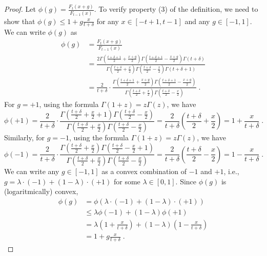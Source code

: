 \begin{proof}
Let $\phi(g) = \frac{F_t(x+g)}{F_{t-1}(x)}$. To verify property (3) of the definition,
we need to show that $\phi(g) \le 1 + g \frac{x}{t+\delta}$
for any $x \in [-t+1, t-1]$ and any $g \in [-1,1]$. We can write $\phi(g)$ as
\begin{align*}
\phi(g)
& = \frac{F_t(x+g)}{F_{t-1}(x)} \\
& = \frac{2 \Gamma(\frac{t+\delta+1}{2} + \frac{x+g}{2}) \Gamma(\frac{t+\delta+1}{2} - \frac{x+g}{2}) \Gamma(t + \delta)}{\Gamma(\frac{t+\delta}{2} + \frac{x}{2}) \Gamma(\frac{t+\delta}{2} - \frac{x}{2}) \Gamma(t+\delta+1)} \\
& = \frac{2}{t+\delta} \cdot \frac{\Gamma(\frac{t+\delta+1}{2} + \frac{x+g}{2}) \Gamma(\frac{t+\delta+1}{2} - \frac{x+g}{2})}{\Gamma(\frac{t+\delta}{2} + \frac{x}{2}) \Gamma(\frac{t+\delta}{2} - \frac{x}{2})} \; .
\end{align*}
For $g=+1$, using the formula $\Gamma(1+z) = z \Gamma(z)$, we have
\[
\phi(+1)
= \frac{2}{t+\delta} \cdot \frac{\Gamma(\frac{t+\delta}{2} + \frac{x}{2} + 1) \Gamma(\frac{t+\delta}{2} - \frac{x}{2})}{\Gamma(\frac{t+\delta}{2} + \frac{x}{2}) \Gamma(\frac{t+\delta}{2} - \frac{x}{2})}
= \frac{2}{t+\delta} \left(\frac{t+\delta}{2} + \frac{x}{2} \right)
= 1 + \frac{x}{t+\delta} \; .
\]
Similarly, for $g=-1$, using the formula $\Gamma(1+z) = z \Gamma(z)$, we have
\[
\phi(-1)
= \frac{2}{t+\delta} \cdot \frac{\Gamma(\frac{t+\delta}{2} + \frac{x}{2}) \Gamma(\frac{t+\delta}{2} - \frac{x}{2} + 1)}{\Gamma(\frac{t+\delta}{2} + \frac{x}{2}) \Gamma(\frac{t+\delta}{2} - \frac{x}{2})}
= \frac{2}{t+\delta} \left(\frac{t+\delta}{2} - \frac{x}{2} \right)
= 1 - \frac{x}{t+\delta} \; .
\]
We can write any $g \in [-1,1]$ as a convex combination of $-1$ and $+1$, i.e.,
$g = \lambda \cdot (-1) + (1-\lambda) \cdot (+1)$ for some $\lambda \in [0,1]$.
Since $\phi(g)$ is (logaritmically) convex,
\begin{align*}
\phi(g)
& = \phi(\lambda \cdot (-1) + (1-\lambda) \cdot (+1)) \\
& \le \lambda \phi(-1) + (1-\lambda) \phi(+1) \\
& = \lambda \left(1 + \frac{x}{t+\delta}\right) + (1-\lambda) \left(1 - \frac{x}{t+\delta}\right) \\
& = 1 + g \frac{x}{t+\delta} \; .
\end{align*}
\end{proof}

